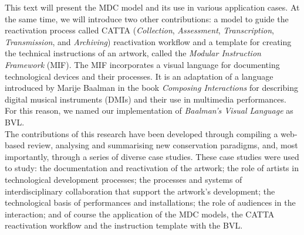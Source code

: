 This text will present the MDC model and its use in various application cases. At the same time, we will introduce two other contributions: a model to guide the reactivation process called CATTA (\textit{Collection}, \textit{Assessment}, \textit{Transcription}, \textit{Transmission}, and \textit{Archiving}) reactivation workflow and a template for creating the technical instructions of an artwork, called the \textit{Modular Instruction Framework} (MIF). The MIF incorporates a visual language for documenting technological devices and their processes. It is an adaptation of a language introduced by Marije Baalman in the book \textit{Composing Interactions} \cite{baalman2022composing} for describing digital musical instruments (DMIs) and their use in multimedia performances. For this reason, we named our implementation of \textit{Baalman’s Visual Language} as BVL.\\
The contributions of this research have been developed through compiling a web-based review, analysing and summarising new conservation paradigms, and, most importantly, through a series of diverse case studies. These case studies were used to study: the documentation and reactivation of the artwork; the role of artists in technological development processes; the processes and systems of interdisciplinary collaboration that support the artwork’s development; the technological basis of performances and installations; the role of audiences in the interaction; and of course the application of the MDC models, the CATTA reactivation workflow and the instruction template with the BVL.\\

